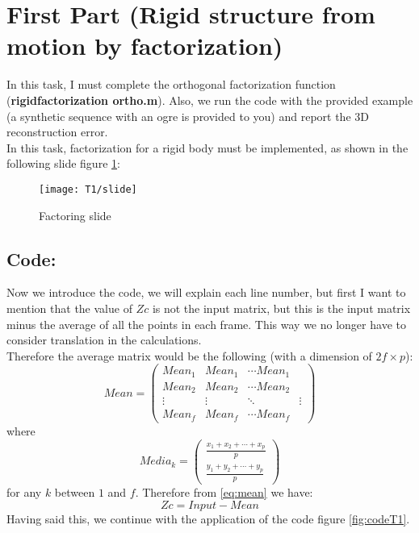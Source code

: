 \section{First Part (Rigid structure from motion by factorization)}
\noindent In this task, I must complete the orthogonal factorization function (\textbf{rigidfactorization ortho.m}). Also, we run the code with the provided example (a synthetic sequence with an ogre is provided to you) and report the 3D reconstruction error.\\

\noindent In this task, factorization for a rigid body must be implemented, as shown in the following slide figure \ref{fig:slideT1}:

\begin{figure}[h]
    \centering
    \texttt{[image: T1/slide]}
    \caption{Factoring slide}
    \label{fig:slideT1}
\end{figure}

\subsection{Code:}
\noindent Now we introduce the code, we will explain each line number, but first I want to mention that the value of $Zc$ is not the input matrix, but this is the input matrix minus the average of all the points in each frame. This way we no longer have to consider translation in the calculations.\\ 
\noindent Therefore the average matrix would be the following (with a dimension of $2f\times p$):
\begin{equation}\label{eq:mean}
Mean=
\begin{pmatrix}
Mean_{1} & Mean_{1} & \cdots Mean_{1}\\
Mean_{2} & Mean_{2} & \cdots Mean_{2}\\
\vdots & \vdots & \ddots & \vdots\\
Mean_{f} & Mean_{f} & \cdots Mean_{f}
\end{pmatrix}
\end{equation}
\noindent where
\begin{equation}
Media_{k}=
\begin{pmatrix}
\frac{x_{1} + x_{2} + \cdots + x_{p}}{p}\\
\frac{y_{1} + y_{2} + \cdots + y_{p}}{p}
\end{pmatrix}
\end{equation}
\noindent for any $k$ between $1$ and $f$.
\noindent Therefore from \ref{eq:mean} we have:
\begin{equation}
Zc=Input-Mean
\end{equation}
\noindent Having said this, we continue with the application of the code figure \ref{fig:codeT1}.\\

